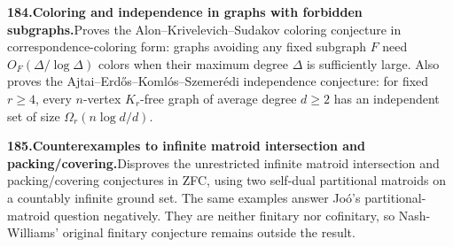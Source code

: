 \documentclass[11pt,a4paper]{article}
\begin{document}
  \par \begin{minipage}{\linewidth}
  \fontsize{10.5}{12.6}\selectfont\RaggedRight
  \hypertarget{result 184}{}
  {\bfseries\textcolor{muted}{184.}\enspace Coloring and independence in graphs with forbidden subgraphs.}\enspace Proves the Alon--Krivelevich--Sudakov coloring conjecture in correspondence-coloring form: graphs avoiding any fixed subgraph $F$ need $O_F(\Delta/\log\Delta)$ colors when their maximum degree $\Delta$ is sufficiently large. Also proves the Ajtai--Erd\H{o}s--Koml\'os--Szemer\'edi independence conjecture: for fixed $r\ge4$, every $n$-vertex $K_r$-free graph of average degree $d\ge2$ has an independent set of size $\Omega_r(n\log d/d)$.\par
  \end{minipage}\par\vspace{5pt}



  \par \begin{minipage}{\linewidth}
  \fontsize{10.5}{12.6}\selectfont\RaggedRight
  \hypertarget{result 185}{}
  {\bfseries\textcolor{muted}{185.}\enspace Counterexamples to infinite matroid intersection and packing/covering.}\enspace Disproves the unrestricted infinite matroid intersection and packing/covering conjectures in ZFC, using two self-dual partitional matroids on a countably infinite ground set. The same examples answer Jo\'o’s partitional-matroid question negatively. They are neither finitary nor cofinitary, so Nash-Williams’ original finitary conjecture remains outside the result.\par
  \end{minipage}\par\vspace{5pt}
\end{document}

